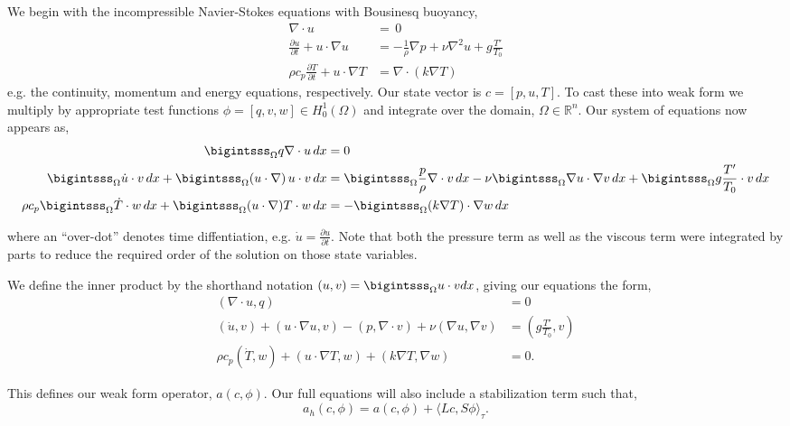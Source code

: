 We begin with the incompressible Navier-Stokes equations with Bousinesq
buoyancy,
\begin{align}
 \nabla \cdot u &= \, 0 \label{eq_cont}\\
 \frac{\partial u}{\partial t} + u \cdot \nabla u &= -\frac{1}{\rho}
 \nabla p + \nu \nabla^2 u + g \frac{T'}{T_0} \label{eq_mom}\\
 \rho c_p \frac{\partial T}{\partial t} + u \cdot \nabla T &= \nabla
 \cdot (k \nabla T) \label{eq_energy}
\end{align}
e.g. the continuity, momentum and energy equations, respectively. Our 
state vector is $c =  \left[p,u,T \right]$. To cast these into
weak form we multiply by appropriate test 
functions $\phi = \left[q,v,w \right] \in H^1_0(\Omega)$ and integrate over
the domain, $\Omega \in \mathbb{R}^n$. Our system of equations now
appears as, 
\begin{align}
  \bigintsss_\Omega q \nabla \cdot u \, dx &= 0 \\
 \bigintsss_\Omega \dot u \cdot v \, dx +
 \bigintsss_\Omega  (u \cdot \nabla) \, u \cdot v \, dx &=
 \bigintsss_\Omega \frac{p}{\rho} \nabla \cdot v \, dx - \nu \bigintsss_\Omega \nabla u \cdot \nabla v
 \,dx + \bigintsss_\Omega g \frac{T'}{T_0} \cdot v \, dx \\ 
 \rho c_p \bigintsss_\Omega \dot T \cdot w \, dx + \bigintsss_\Omega (u
 \cdot \nabla) T \cdot w \, dx  &= -\bigintsss_\Omega (k \nabla T) \cdot
 \nabla w \, dx
\end{align}

where an ``over-dot'' denotes time diffentiation, e.g. $\dot u =
\frac{\partial u}{\partial t}$. Note that both the pressure term as well
as the viscous term were integrated by parts to reduce the required
order of the solution on those state variables.  

We define the inner product by the shorthand notation $(u,v) =
\bigintsss_\Omega u\cdot v dx $, giving our equations the form,  
\begin{align}
 (\nabla \cdot u, q) &= 0 \\
 (\dot u,v) + (u \cdot \nabla u, v) - (p,\nabla \cdot v) + \nu (\nabla
 u, \nabla v) &= (g \frac{T'}{T_0},v) \\
 \rho c_p (\dot T,w) + (u \cdot \nabla T,w) + (k \nabla T,\nabla w) &= 0.
\end{align}

This defines our weak form operator, $ a(c,\phi)$. Our full equations will
also include a stabilization term such that,  
\begin{equation}
 a_h(c,\phi) = a(c,\phi) +  \langle Lc,S\phi \rangle_\tau. 
\end{equation}

